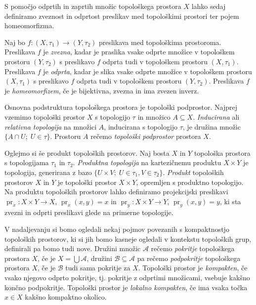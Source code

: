\documentclass[mat1]{fmfdelo}
\DeclareMathOperator{\pr}{pr}
\begin{document}
S pomočjo odprtih in zaprtih množic topološkega prostora $X$ lahko sedaj de\-fi\-ni\-ra\-mo zveznost in odprtost preslikav med topološkimi prostori ter pojem ho\-me\-o\-mor\-fiz\-ma.

Naj bo $f\colon (X, \tau_1) \to (Y, \tau_2)$ preslikava med topološkima prostoroma.
Preslikava $f$ je \emph{zvezna}, kadar je praslika vsake odprte množice v topološkem prostoru $(Y, \tau_2)$ s preslikavo $f$ odprta tudi v topološkem prostoru $(X, \tau_1)$.
Preslikava $f$ je \emph{odprta}, kadar je slika vsake odprte množice v topološkem prostoru $(X, \tau_1)$ s preslikavo $f$ odprta tudi v topološkem prostoru $(Y, \tau_2)$.
Preslikava $f$ je \emph{homeomorfizem}, če je bijektivna, zvezna in ima zvezen inverz.

Osnovna podstruktura topološkega prostora je topološki podprostor.
Najprej vzemimo topološki prostor $X$ s topologijo $\tau$ in množico $A \subseteq X$. \emph{Inducirana} ali \emph{relativna topologija} na množici $A$, inducirana s topologijo $\tau$, je družina množic $\lbrace A \cap U ;\; U \in \tau \rbrace$. Prostoru $A$ rečemo \emph{topološki podprostor} prostora $X$.

Oglejmo si še produkt topoloških prostorov.
Naj bosta $X$ in $Y$ topološka prostora s topologijama $\tau_1$ in $\tau_2$. \emph{Produktna topologija} na kartezičnemu produktu $X \times Y$ je topologija, generirana z bazo $\lbrace U \times V ;\; U \in \tau_1, V \in \tau_2 \rbrace$. \emph{Produkt} topoloških prostorov $X$ in $Y$ je topološki prostor $X \times Y$, opremljen s produktno topologijo. Na produktu topoloških prostorov lahko definiramo projekcijski preslikavi $\pr_x\colon X \times Y \to X$, $\pr_x(x, y) = x$ in $\pr_y\colon X \times Y \to Y$, $\pr_y(x, y) = y$, ki sta zvezni in odprti preslikavi glede na primerne topologije.

V nadaljevanju si bomo ogledali nekaj pojmov povezanih s kompaktnostjo to\-po\-loš\-kih prostorov, ki si jih bomo kasneje ogledali v kontekstu topoloških grup, definirali pa bomo tudi nove.
Družini množic $\mathcal{A}$ rečemo \emph{pokritje} topološkega prostora $X$, če je $X = \bigcup \mathcal{A}$, družini $\mathcal{B} \subseteq \mathcal{A}$ pa rečemo \emph{podpokritje} topološkega prostora $X$, če je $\mathcal{B}$ tudi sama pokritje za $X$.
Topološki prostor je \emph{kompakten}, če vsako njegovo odprto pokritje, tj. pokritje z odprtimi množicami, vsebuje kakšno končno podpokritje.
Topološki prostor je \emph{lokalno kompakten}, če ima vsaka točka $x \in X$ kakšno kompaktno okolico.
\end{document}
